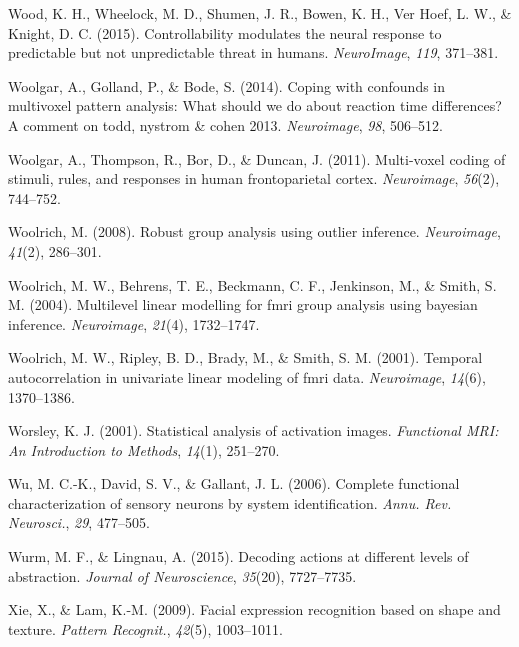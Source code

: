 \documentclass[12pt,american,a4paper,oneside,]{memoir} %
\begin{document}
\leavevmode\hypertarget{ref-wood2015controllability}{}%
Wood, K. H., Wheelock, M. D., Shumen, J. R., Bowen, K. H., Ver Hoef, L. W., \& Knight, D. C. (2015). Controllability modulates the neural response to predictable but not unpredictable threat in humans. \emph{NeuroImage}, \emph{119}, 371--381.

\leavevmode\hypertarget{ref-Woolgar2014-jb}{}%
Woolgar, A., Golland, P., \& Bode, S. (2014). Coping with confounds in multivoxel pattern analysis: What should we do about reaction time differences? A comment on todd, nystrom \& cohen 2013. \emph{Neuroimage}, \emph{98}, 506--512.

\leavevmode\hypertarget{ref-woolgar2011multi}{}%
Woolgar, A., Thompson, R., Bor, D., \& Duncan, J. (2011). Multi-voxel coding of stimuli, rules, and responses in human frontoparietal cortex. \emph{Neuroimage}, \emph{56}(2), 744--752.

\leavevmode\hypertarget{ref-woolrich2008robust}{}%
Woolrich, M. (2008). Robust group analysis using outlier inference. \emph{Neuroimage}, \emph{41}(2), 286--301.

\leavevmode\hypertarget{ref-woolrich2004multilevel}{}%
Woolrich, M. W., Behrens, T. E., Beckmann, C. F., Jenkinson, M., \& Smith, S. M. (2004). Multilevel linear modelling for fmri group analysis using bayesian inference. \emph{Neuroimage}, \emph{21}(4), 1732--1747.

\leavevmode\hypertarget{ref-woolrich2001temporal}{}%
Woolrich, M. W., Ripley, B. D., Brady, M., \& Smith, S. M. (2001). Temporal autocorrelation in univariate linear modeling of fmri data. \emph{Neuroimage}, \emph{14}(6), 1370--1386.

\leavevmode\hypertarget{ref-worsley2001statistical}{}%
Worsley, K. J. (2001). Statistical analysis of activation images. \emph{Functional MRI: An Introduction to Methods}, \emph{14}(1), 251--270.

\leavevmode\hypertarget{ref-Wu2006-qs}{}%
Wu, M. C.-K., David, S. V., \& Gallant, J. L. (2006). Complete functional characterization of sensory neurons by system identification. \emph{Annu. Rev. Neurosci.}, \emph{29}, 477--505.

\leavevmode\hypertarget{ref-wurm2015decoding}{}%
Wurm, M. F., \& Lingnau, A. (2015). Decoding actions at different levels of abstraction. \emph{Journal of Neuroscience}, \emph{35}(20), 7727--7735.

\leavevmode\hypertarget{ref-Xie2009-fp}{}%
Xie, X., \& Lam, K.-M. (2009). Facial expression recognition based on shape and texture. \emph{Pattern Recognit.}, \emph{42}(5), 1003--1011.
\end{document}
